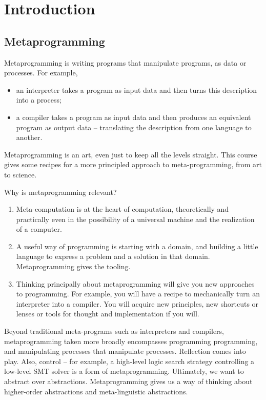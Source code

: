 \chapter{Introduction}

\section{Metaprogramming}


Metaprogramming is writing programs that manipulate programs, as
data or processes. For example,
\begin{itemize}
\item an interpreter takes a program as input data and then turns this
  description into a process;
\item a compiler takes a program as input data and then produces an
  equivalent program as output data -- translating the description
  from one language to another.
\end{itemize}

Metaprogramming is an art, even just to keep all the levels straight.
This course gives some recipes for a more principled approach to
meta-programming, from art to science.

Why is metaprogramming relevant?

\begin{enumerate}
\item Meta-computation is at the heart of computation, theoretically
and practically even in the possibility of a universal machine and the
realization of a computer.

\item A useful way of programming is starting with a domain, and
building a little language to express a problem and a solution in that
domain. Metaprogramming gives the tooling.

\item Thinking principally about metaprogramming will give you new
approaches to programming. For example,
you will have a recipe to mechanically turn an interpreter into a
compiler. You will acquire new principles, new shortcuts or lenses or
tools for thought and implementation if you will.

\end{enumerate}

Beyond traditional meta-programs such as interpreters and compilers,
metaprogramming taken more broadly
encompasses programming programming, and manipulating processes that
manipulate processes. Reflection comes into play. Also, control -- for
example, a high-level logic search strategy controlling a low-level
SMT solver is a form of metaprogramming.
Ultimately, we want to abstract over abstractions. Metaprogramming
gives us a way of thinking about higher-order abstractions and
meta-linguistic abstractions.

